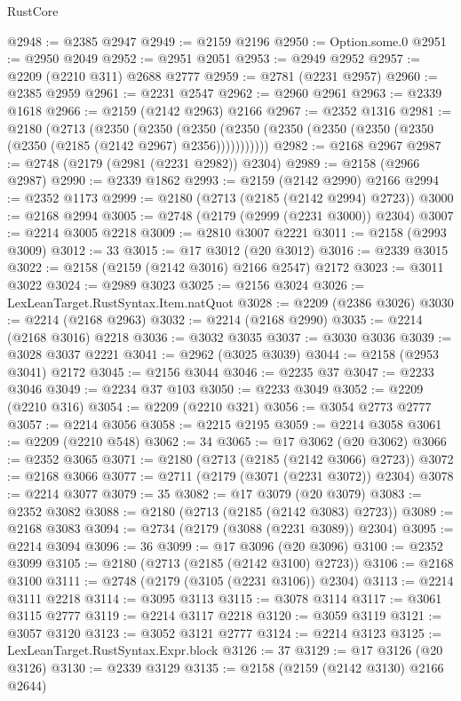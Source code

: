 \begin{lexlean}{RustCore}
\begin{coremodule}
@2948 := @2385 @2947
@2949 := @2159 @2196
@2950 := Option.some.{0}
@2951 := @2950 @2049
@2952 := @2951 @2051
@2953 := @2949 @2952
@2957 := @2209 (@2210 @311) @2688 @2777
@2959 := @2781 (@2231 @2957)
@2960 := @2385 @2959
@2961 := @2231 @2547
@2962 := @2960 @2961
@2963 := @2339 @1618
@2966 := @2159 (@2142 @2963) @2166
@2967 := @2352 @1316
@2981 := @2180
    (@2713
      (@2350
        (@2350
          (@2350 (@2350 (@2350 (@2350 (@2350 (@2350 (@2350 (@2185 (@2142 @2967) @2356)))))))))))
@2982 := @2168 @2967
@2987 := @2748 (@2179 (@2981 (@2231 @2982)) @2304)
@2989 := @2158 (@2966 @2987)
@2990 := @2339 @1862
@2993 := @2159 (@2142 @2990) @2166
@2994 := @2352 @1173
@2999 := @2180 (@2713 (@2185 (@2142 @2994) @2723))
@3000 := @2168 @2994
@3005 := @2748 (@2179 (@2999 (@2231 @3000)) @2304)
@3007 := @2214 @3005 @2218
@3009 := @2810 @3007 @2221
@3011 := @2158 (@2993 @3009)
@3012 := 33
@3015 := @17 @3012 (@20 @3012)
@3016 := @2339 @3015
@3022 := @2158 (@2159 (@2142 @3016) @2166 @2547) @2172
@3023 := @3011 @3022
@3024 := @2989 @3023
@3025 := @2156 @3024
@3026 := LexLeanTarget.RustSyntax.Item.natQuot
@3028 := @2209 (@2386 @3026)
@3030 := @2214 (@2168 @2963)
@3032 := @2214 (@2168 @2990)
@3035 := @2214 (@2168 @3016) @2218
@3036 := @3032 @3035
@3037 := @3030 @3036
@3039 := @3028 @3037 @2221
@3041 := @2962 (@3025 @3039)
@3044 := @2158 (@2953 @3041) @2172
@3045 := @2156 @3044
@3046 := @2235 @37
@3047 := @2233 @3046
@3049 := @2234 @37 @103
@3050 := @2233 @3049
@3052 := @2209 (@2210 @316)
@3054 := @2209 (@2210 @321)
@3056 := @3054 @2773 @2777
@3057 := @2214 @3056
@3058 := @2215 @2195
@3059 := @2214 @3058
@3061 := @2209 (@2210 @548)
@3062 := 34
@3065 := @17 @3062 (@20 @3062)
@3066 := @2352 @3065
@3071 := @2180 (@2713 (@2185 (@2142 @3066) @2723))
@3072 := @2168 @3066
@3077 := @2711 (@2179 (@3071 (@2231 @3072)) @2304)
@3078 := @2214 @3077
@3079 := 35
@3082 := @17 @3079 (@20 @3079)
@3083 := @2352 @3082
@3088 := @2180 (@2713 (@2185 (@2142 @3083) @2723))
@3089 := @2168 @3083
@3094 := @2734 (@2179 (@3088 (@2231 @3089)) @2304)
@3095 := @2214 @3094
@3096 := 36
@3099 := @17 @3096 (@20 @3096)
@3100 := @2352 @3099
@3105 := @2180 (@2713 (@2185 (@2142 @3100) @2723))
@3106 := @2168 @3100
@3111 := @2748 (@2179 (@3105 (@2231 @3106)) @2304)
@3113 := @2214 @3111 @2218
@3114 := @3095 @3113
@3115 := @3078 @3114
@3117 := @3061 @3115 @2777
@3119 := @2214 @3117 @2218
@3120 := @3059 @3119
@3121 := @3057 @3120
@3123 := @3052 @3121 @2777
@3124 := @2214 @3123
@3125 := LexLeanTarget.RustSyntax.Expr.block
@3126 := 37
@3129 := @17 @3126 (@20 @3126)
@3130 := @2339 @3129
@3135 := @2158 (@2159 (@2142 @3130) @2166 @2644)

\end{coremodule}
\end{lexlean}

